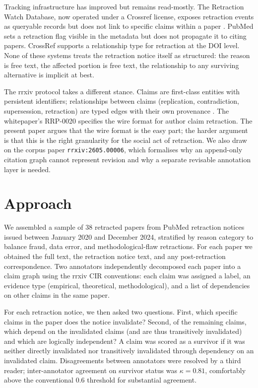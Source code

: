 \documentclass{rrxiv}
\begin{document}
Tracking infrastructure has improved but remains read-mostly. The Retraction Watch Database, now operated under a Crossref license, exposes retraction events as queryable records but does not link to specific claims within a paper \cite{retractionwatch}. PubMed sets a retraction flag visible in the metadata but does not propagate it to citing papers. CrossRef supports a relationship type for retraction at the DOI level. None of these systems treats the retraction notice itself as structured: the reason is free text, the affected portion is free text, the relationship to any surviving alternative is implicit at best.

The rrxiv protocol takes a different stance. Claims are first-class entities with persistent identifiers; relationships between claims (replication, contradiction, supersession, retraction) are typed edges with their own provenance \cite{rrxivwhitepaper}. The whitepaper's RRP-0020 specifies the wire format for author claim retraction. The present paper argues that the wire format is the easy part; the harder argument is that this is the right granularity for the social act of retraction. We also draw on the corpus paper \texttt{rrxiv:2605.00006}, which formalises why an append-only citation graph cannot represent revision and why a separate revisable annotation layer is needed.

\section{Approach}
\label{sec:approach}
We assembled a sample of 38 retracted papers from PubMed retraction notices issued between January 2020 and December 2024, stratified by reason category to balance fraud, data error, and methodological-flaw retractions. For each paper we obtained the full text, the retraction notice text, and any post-retraction correspondence. Two annotators independently decomposed each paper into a claim graph using the rrxiv CIR conventions: each claim was assigned a label, an evidence type (empirical, theoretical, methodological), and a list of dependencies on other claims in the same paper.

For each retraction notice, we then asked two questions. First, which specific claims in the paper does the notice invalidate? Second, of the remaining claims, which depend on the invalidated claims (and are thus transitively invalidated) and which are logically independent? A claim was scored as a survivor if it was neither directly invalidated nor transitively invalidated through dependency on an invalidated claim. Disagreements between annotators were resolved by a third reader; inter-annotator agreement on survivor status was $\kappa = 0.81$, comfortably above the conventional 0.6 threshold for substantial agreement.
\end{document}
